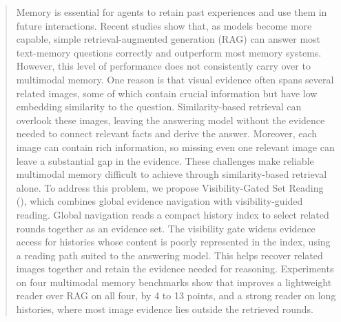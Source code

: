 \begin{abstract}
Memory is essential for agents to retain past experiences and use them in future interactions. Recent studies show that, as models become more capable, simple retrieval-augmented generation (RAG) can answer most text-memory questions correctly and outperform most memory systems. However, this level of performance does not consistently carry over to multimodal memory. One reason is that visual evidence often spans several related images, some of which contain crucial information but have low embedding similarity to the question. Similarity-based retrieval can overlook these images, leaving the answering model without the evidence needed to connect relevant facts and derive the answer. Moreover, each image can contain rich information, so missing even one relevant image can leave a substantial gap in the evidence. These challenges make reliable multimodal memory difficult to achieve through similarity-based retrieval alone. To address this problem, we propose Visibility-Gated Set Reading (\vgs{}), which combines global evidence navigation with visibility-guided reading. Global navigation reads a compact history index to select related rounds together as an evidence set. The visibility gate widens evidence access for histories whose content is poorly represented in the index, using a reading path suited to the answering model. This helps \vgs{} recover related images together and retain the evidence needed for reasoning. Experiments on four multimodal memory benchmarks show that \vgs{} improves a lightweight reader over RAG on all four, by 4 to 13 points, and a strong reader on long histories, where most image evidence lies outside the retrieved rounds.
\end{abstract}
